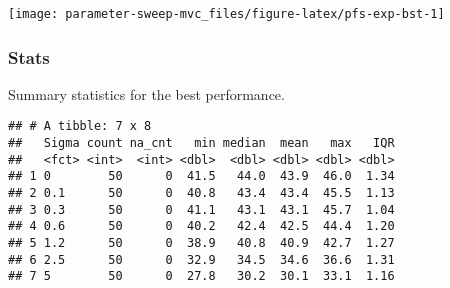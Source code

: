 \documentclass[]{book}
\newenvironment{Shaded}{\begin{snugshade}}{\end{snugshade}}
\newcommand{\DataTypeTok}[1]{\textcolor[rgb]{0.13,0.29,0.53}{#1}}
\newcommand{\KeywordTok}[1]{\textcolor[rgb]{0.13,0.29,0.53}{\textbf{#1}}}
\newcommand{\NormalTok}[1]{#1}
\newcommand{\OperatorTok}[1]{\textcolor[rgb]{0.81,0.36,0.00}{\textbf{#1}}}
\newcommand{\OtherTok}[1]{\textcolor[rgb]{0.56,0.35,0.01}{#1}}
\newcommand{\StringTok}[1]{\textcolor[rgb]{0.31,0.60,0.02}{#1}}
\begin{document}
\texttt{[image: parameter-sweep-mvc\_files/figure-latex/pfs-exp-bst-1]}

\hypertarget{stats-30}{%
\subsubsection{Stats}\label{stats-30}}

Summary statistics for the best performance.

\begin{Shaded}
\end{Shaded}

\begin{verbatim}
## # A tibble: 7 x 8
##   Sigma count na_cnt   min median  mean   max   IQR
##   <fct> <int>  <int> <dbl>  <dbl> <dbl> <dbl> <dbl>
## 1 0        50      0  41.5   44.0  43.9  46.0  1.34
## 2 0.1      50      0  40.8   43.4  43.4  45.5  1.13
## 3 0.3      50      0  41.1   43.1  43.1  45.7  1.04
## 4 0.6      50      0  40.2   42.4  42.5  44.4  1.20
## 5 1.2      50      0  38.9   40.8  40.9  42.7  1.27
## 6 2.5      50      0  32.9   34.5  34.6  36.6  1.31
## 7 5        50      0  27.8   30.2  30.1  33.1  1.16
\end{verbatim}
\end{document}
